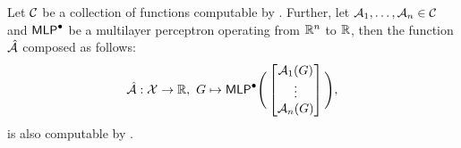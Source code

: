 \begin{lemma}\label{lem:composition_lemma_gnn}
    Let $\mathcal{C}$ be a collection of functions computable by \gnns. Further, let  $\mathcal{A}_1, \dots , \mathcal{A}_n \in \mathcal{C}$ and $\textsf{MLP}^\bullet$ be a multilayer perceptron operating from $\mathbb{R}^n$ to $\mathbb{R}$, then the function $\hat{\mathcal{A}}$ composed  as follows:
    \begin{equation*}
        \hat{\mathcal{A}} : \mathcal{X} \rightarrow \mathbb{R},\ G \mapsto \textsf{MLP}^\bullet \Bigg(
        \begin{bmatrix}
            \mathcal{A}_1(G)\\
             \vdots \\
            \mathcal{A}_n(G)
        \end{bmatrix}
        \Bigg),
    \end{equation*}
    is also computable by \gnn.
\end{lemma}

